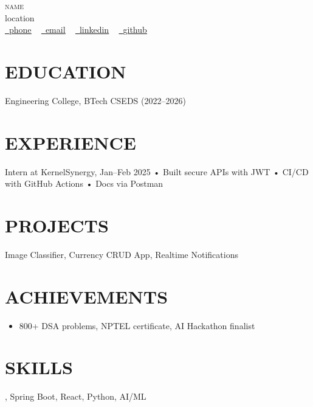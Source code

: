 \documentclass[letterpaper,11pt]{article}
\newcommand{\resumeItem}[1]{\item\small{#1\vspace{-2pt}}}
\newcommand{\resumeSubHeadingListStart}{\begin{itemize}[leftmargin=0in, label={}]}
\newcommand{\resumeSubHeadingListEnd}{\end{itemize}}
\begin{document}
\begin{center}
{\Huge \scshape {{name}}} \\ \vspace{1pt}
{{location}} \\ \vspace{1pt}
\small
\href{tel:{{phone}}}{\faPhone\ \underline{{phone}}} ~
\href{mailto:{{email}}}{\faEnvelope\ \underline{{email}}} ~
\href{https://linkedin.com/in/{{linkedin}}}{\faLinkedinSquare\ \underline{{linkedin}}} ~
\href{https://github.com/{{github}}}{\faGithub\ \underline{{github}}}
\vspace{-8pt}
\end{center}

\section{EDUCATION}
\resumeSubHeadingListStart
\resumeItemABES Engineering College, BTech CSEDS (2022–2026)
\resumeSubHeadingListEnd

\section{EXPERIENCE}
\resumeSubHeadingListStart
\resumeItemSDE Intern at KernelSynergy, Jan–Feb 2025
• Built secure APIs with JWT
• CI/CD with GitHub Actions
• Docs via Postman
\resumeSubHeadingListEnd

\section{PROJECTS}
\resumeSubHeadingListStart
\resumeItemCNN Image Classifier, Currency CRUD App, Realtime Notifications
\resumeSubHeadingListEnd

\section{ACHIEVEMENTS}
\resumeSubHeadingListStart
\resumeItem800+ DSA problems, NPTEL certificate, AI Hackathon finalist
\resumeSubHeadingListEnd

\section{SKILLS}
\resumeSubHeadingListStart
\resumeItemJava, Spring Boot, React, Python, AI/ML
\resumeSubHeadingListEnd
\end{document}
